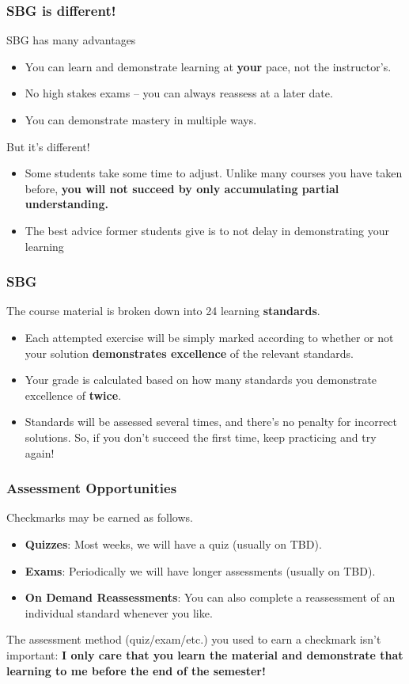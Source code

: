 \documentclass[aspectratio=1610]{beamer}
\begin{document}
\begin{frame}\frametitle{SBG is different!}
SBG has many advantages
\begin{itemize}
\item You can learn and demonstrate learning at \textbf{your} pace, not the instructor's.
\item No high stakes exams -- you can always reassess at a later date.
\item You can demonstrate mastery in multiple ways.
\end{itemize}
\vfill
But it's different!
\begin{itemize}
\item Some students take some time to adjust.  Unlike many courses you have taken before, \textbf{you will not succeed by only accumulating partial understanding.}
\item The best advice former students give is to not delay in demonstrating your learning
\end{itemize}
\end{frame}




\begin{frame}\frametitle{SBG}
The course material is broken down into 24 learning \textbf{standards}.
\begin{itemize}
\item Each attempted exercise will be simply marked according to whether or not
      your solution \textbf{demonstrates excellence} of the relevant standards.
\item Your grade is calculated based on how many standards you demonstrate excellence of \textbf{twice}.
\item Standards will be assessed several times, and there's no penalty for
      incorrect solutions. So, if you don't succeed the first time,
      keep practicing and try again!
\end{itemize}
\end{frame}

\begin{frame}\frametitle{Assessment Opportunities}
Checkmarks may be earned as follows.
\begin{itemize}
\item {\bf Quizzes}: Most weeks, we will have a quiz (usually on TBD). 
\item {\bf Exams}: Periodically we will have longer assessments (usually on TBD).
\item {\bf On Demand Reassessments}: You can also complete a reassessment of an individual standard whenever you like.
\end{itemize}

\pause

\vspace{0.2in}

The assessment method (quiz/exam/etc.) you used to earn a checkmark
isn't important: \textbf{I only care that you
learn the material and demonstrate that learning to me before the end of the
semester!}
\end{frame}
\end{document}
